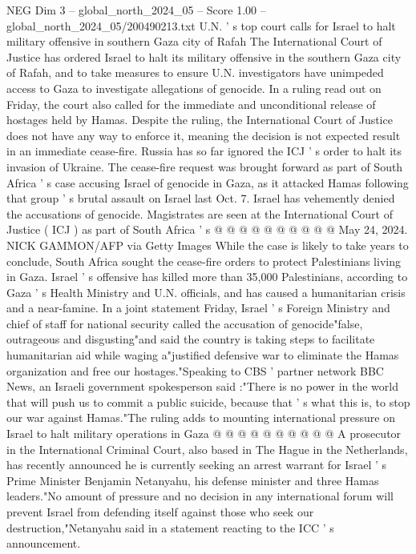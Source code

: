 \begin{textsample}{NEG Dim 3 – global\_north\_2024\_05 – Score 1.00 – global\_north\_2024\_05/200490213.txt}  \label{ex:f3_neg_447}
U.N. ' s top court calls for Israel to halt military offensive in southern Gaza city of Rafah The International Court of Justice has ordered Israel to halt its military offensive in the southern Gaza city of Rafah, and to take measures to ensure U.N. investigators have unimpeded access to Gaza to investigate allegations of genocide.
In a ruling read out on Friday, the court also called for the immediate and unconditional release of hostages held by Hamas.
Despite the ruling, the International Court of Justice does not have any way to enforce it, meaning the decision is not expected result in an immediate cease-fire.
Russia has so far ignored the ICJ ' s order to halt its invasion of Ukraine.
The cease-fire request was brought forward as part of South Africa ' s case accusing Israel of genocide in Gaza, as it attacked Hamas following that group ' s brutal assault on Israel last Oct. 7.
Israel has vehemently denied the accusations of genocide.
Magistrates are seen at the International Court of Justice ( ICJ ) as part of South Africa ' s @ @ @ @ @ @ @ @ @ @ May 24, 2024.
NICK GAMMON/AFP via Getty Images While the case is likely to take years to conclude, South Africa sought the cease-fire orders to protect Palestinians living in Gaza.
Israel ' s offensive has killed more than 35,000 Palestinians, according to Gaza ' s Health Ministry and U.N. officials, and has caused a humanitarian crisis and a near-famine.
In a joint statement Friday, Israel ' s Foreign Ministry and chief of staff for national security called the accusation of genocide"false, outrageous and disgusting"and said the country is taking steps to facilitate humanitarian aid while waging a"justified defensive war to eliminate the Hamas organization and free our hostages."Speaking to CBS ' partner network BBC News, an Israeli government spokesperson said :"There is no power in the world that will push us to commit a public suicide, because that ' s what this is, to stop our war against Hamas."The ruling adds to mounting international pressure on Israel to halt military operations in Gaza @ @ @ @ @ @ @ @ @ @ A prosecutor in the International Criminal Court, also based in The Hague in the Netherlands, has recently announced he is currently seeking an arrest warrant for Israel ' s Prime Minister Benjamin Netanyahu, his defense minister and three Hamas leaders."No amount of pressure and no decision in any international forum will prevent Israel from defending itself against those who seek our destruction,"Netanyahu said in a statement reacting to the ICC ' s announcement.

\end{textsample}
